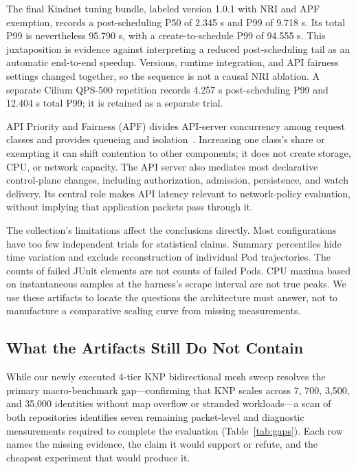 \documentclass[letterpaper,twocolumn,10pt]{article}
\newcommand{\sys}{\textsc{KNP}}
\begin{document}
The final Kindnet tuning bundle, labeled version 1.0.1 with NRI and
APF exemption, records a post-scheduling P50 of 2.345 s and P99 of
9.718 s. Its total P99 is nevertheless 95.790 s, with a
create-to-schedule P99 of 94.555 s. This juxtaposition is evidence
against interpreting a reduced post-scheduling tail as an automatic
end-to-end speedup. Versions, runtime integration, and API fairness
settings changed together, so the sequence is not a causal NRI ablation.
A separate Cilium QPS-500 repetition records 4.257 s post-scheduling
P99 and 12.404 s total P99; it is retained as a separate trial.

API Priority and Fairness (APF) divides API-server concurrency among
request classes and provides queueing and isolation~\cite{k8sapf}.
Increasing one class's share or exempting it can shift contention to
other components; it does not create storage, CPU, or network capacity.
The API server also mediates most declarative control-plane changes,
including authorization, admission, persistence, and watch delivery.
Its central role makes API latency relevant to network-policy evaluation,
without implying that application packets pass through it.

The collection's limitations affect the conclusions directly. Most
configurations have too few independent trials for statistical claims.
Summary percentiles hide time variation and exclude reconstruction of
individual Pod trajectories. The counts of failed JUnit elements are
not counts of failed Pods. CPU maxima based on instantaneous samples
at the harness's scrape interval are not true peaks. We use these
artifacts to locate the questions the architecture must answer, not
to manufacture a comparative scaling curve from missing measurements.

\subsection{What the Artifacts Still Do Not Contain}
\label{sec:gaps}
While our newly executed 4-tier \sys{} bidirectional mesh sweep resolves
the primary macro-benchmark gap---confirming that \sys{} scales across
7, 700, 3,500, and 35,000 identities without map overflow or stranded
workloads---a scan of both repositories identifies seven remaining
packet-level and diagnostic measurements required to complete the
evaluation (Table~\ref{tab:gaps}). Each row names the missing evidence,
the claim it would support or refute, and the cheapest experiment that
would produce it.
\end{document}
